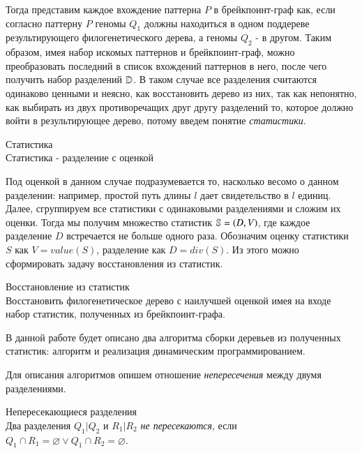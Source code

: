 Тогда представим каждое вхождение паттерна $P$ в брейкпоинт-граф как, если согласно паттерну $P$ геномы $Q_1$ должны находиться в одном поддереве
результирующего филогенетического дерева, а геномы $Q_2$ - в другом.
Таким образом, имея набор искомых паттернов и брейкпоинт-граф, можно преобразовать последний в список вхождений паттернов в него,
после чего получить набор разделений $\mathbb{D}$.
В таком случае все разделения считаются одинаково ценными и неясно, как восстановить дерево из них, так как непонятно,
как выбирать из двух противоречащих друг другу разделений то, которое должно войти в результирующее дерево,
потому введем понятие \textit{статистики}.
\begin{define}{Статистика}\\
  Статистика - разделение с оценкой
\end{define}
Под оценкой в данном случае подразумевается то, насколько весомо  о данном разделении:
например, простой путь длины $l$ дает свидетельство в $l$ единиц.
Далее, сгруппируем все статистики с одинаковыми разделениями и сложим их оценки.
Тогда мы получим множество статистик $\mathbb{S} = {(D, V)}$, где каждое разделение $D$ встречается не больше одного раза.
Обозначим оценку статистики $S$ как $V = value(S)$, разделение как $D = div(S)$.
Из этого можно сформировать задачу восстановления из статистик.
\begin{task}{Восстановление из статистик} \\
  Восстановить филогенетическое дерево с наилучшей оценкой имея на входе набор статистик,
  полученных из брейкпоинт-графа.
\end{task}

В данной работе будет описано два алгоритма сборки деревьев из полученных статистик:
алгоритм  и реализация динамическим программированием.

Для описания алгоритмов опишем отношение \textit{непересечения} между двумя разделениями.
\begin{define}{Непересекающиеся разделения} \\
  Два разделения $Q_1|Q_2$ и $R_1|R_2$ \textit{не пересекаются},
  если $Q_1 \cap R_1 = \varnothing \vee Q_1 \cap R_2 = \varnothing $.
\end{define}

